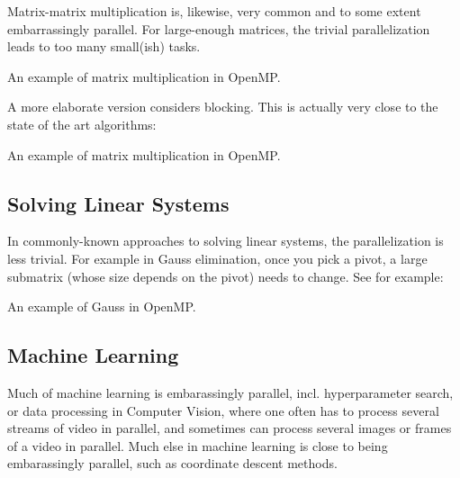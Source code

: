 Matrix-matrix multiplication is, likewise, very common and to some extent 
embarrassingly parallel. For large-enough matrices, the trivial parallelization
leads to too many small(ish) tasks. 

\begin{codebox}[breakable]{}
\footnotesize An example of matrix multiplication in OpenMP.
\tcblower
{}
\end{codebox}

A more elaborate version considers blocking. This is actually very 
close to the state of the art algorithms:

\begin{codebox}[breakable]{}
\footnotesize An example of matrix multiplication in OpenMP.
\tcblower
{}
\end{codebox}


\subsection{Solving Linear Systems}

In commonly-known approaches to solving linear systems, 
the parallelization is less trivial. For example in Gauss
elimination, once you pick a pivot, a large submatrix 
(whose size depends on the pivot) needs to change. 
See for example:

\begin{codebox}[breakable]{}
\footnotesize An example of Gauss in OpenMP.
\tcblower
{}
\end{codebox}

\subsection{Machine Learning}

Much of machine learning is embarassingly parallel, 
incl. hyperparameter search, 
or data processing in Computer Vision, 
where one often has to process  
several streams of video in parallel, 
and sometimes can process several images or frames 
of a video in parallel.
Much else in machine learning is close to being
 embarassingly parallel, 
such as coordinate descent methods.

